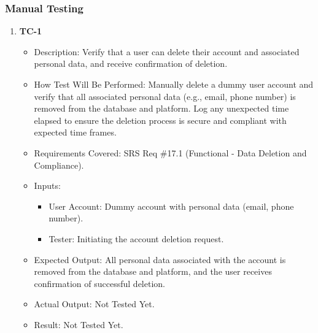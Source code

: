 \documentclass[12pt, titlepage]{article}
\begin{document}
\subsubsection{Manual Testing}
\begin{enumerate}
    \item \textbf{TC-1}  
    \begin{itemize}
        \item Description: Verify that a user can delete their account and associated personal data, and receive confirmation of deletion.
        \item How Test Will Be Performed: Manually delete a dummy user account and verify that all associated personal data (e.g., email, phone number) is removed from the database and platform. Log any unexpected time elapsed to ensure the deletion process is secure and compliant with expected time frames.
        \item Requirements Covered: SRS Req \#17.1 (Functional - Data Deletion and Compliance).
        \item Inputs:  
            \begin{itemize}
                \item User Account: Dummy account with personal data (email, phone number).
                \item Tester: Initiating the account deletion request.
            \end{itemize}
        \item Expected Output: All personal data associated with the account is removed from the database and platform, and the user receives confirmation of successful deletion.
        \item Actual Output: Not Tested Yet.
        \item Result: Not Tested Yet.
    \end{itemize}


\end{enumerate}
\end{document}
